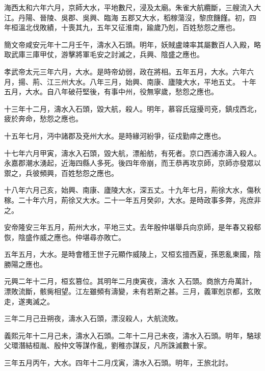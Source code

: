\begin{pinyinscope}
 海西太和六年六月，京師大水，平地數尺，浸及太廟。朱雀大航纜斷，三艘流入大江。丹陽、晉陵、吳郡、吳興、臨海
 五郡又大水，稻稼蕩沒，黎庶饑饉。初，四年桓溫北伐敗績，十喪其九，五年又征淮南，踰歲乃剋，百姓愁怨之應也。



 簡文帝咸安元年十二月壬午，濤水入石頭。明年，妖賊盧竦率其屬數百人入殿，略取武庫三庫甲仗，游擊將軍毛安之討滅之，兵興、陰盛之應也。



 孝武帝太元三年六月，大水。是時帝幼弱，政在將相。五年五月，大水。六年六月，揚、荊、江三州大水。八年三月，始興、南康、廬陵大水，平地五丈。
 十年五月，大水。自八年破苻堅後，有事中州，役無寧歲，愁怨之應也。



 十三年十二月，濤水入石頭，毀大航，殺人。明年，慕容氏寇擾司兗，鎮戍西北，疲於奔命，愁怨之應也。



 十五年七月，沔中諸郡及兗州大水。是時緣河紛爭，征戍勤瘁之應也。



 十七年六月甲寅，濤水入石頭，毀大航，漂船舫，有死者。京口西浦亦濤入殺人。永嘉郡潮水湧起，近海四縣人多死。後四年帝崩，而王恭再攻京師，京師亦發眾以禦之，兵彼頻興，百姓愁怨之應也。



 十八年六月己亥，始興、南康、廬陵大水，深五丈。十九年七月，荊徐大水，傷秋稼。二十年六月，荊徐又大水。二十一年五月癸卯，大水。是時政事多弊，兆庶非之。



 安帝隆安三年五月，荊州大水，平地三丈。去年殷仲堪舉兵向京師，是年春又殺郗恢，陰盛作威之應也。仲堪尋亦敗亡。



 五年五月，大水。是時會稽王世子元顯作威陵上，又桓玄擅西夏，孫恩亂東國，陰勝陽之應也。



 元興二年十二月，桓玄篡位。其明年二月庚寅夜，濤水
 入石頭。商旅方舟萬計，漂敗流斷，骸胔相望。江左雖頻有濤變，未有若斯之甚。三月，義軍剋京都，玄敗走，遂夷滅之。



 三年二月己丑朔夜，濤水入石頭，漂沒殺人，大航流敗。



 義熙元年十二月己未，濤水入石頭。二年十二月己未夜，濤水入石頭。明年，駱球父環潛結桓胤、殷仲文等謀作亂，劉稚亦謀反，凡所誅滅數十家。



 三年五月丙午，大水。四年十二月戊寅，濤水入石頭。明年，王旅北討。




\end{pinyinscope}
